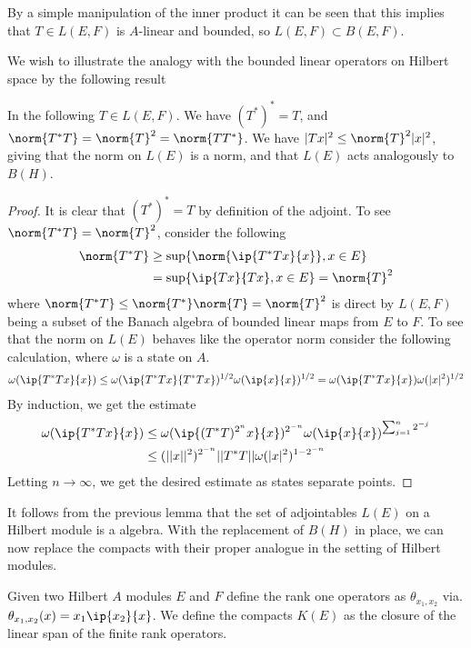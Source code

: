 \begin{remark}
	By a simple manipulation of the inner product it can be seen that this implies that $T\in L(E,F)$ is $A$-linear and bounded, so $L(E,F)\subset B(E,F)$.
\end{remark}
We wish to illustrate the analogy with the bounded linear operators on Hilbert space by the following result 
\begin{lemma}
	In the following $T\in L(E,F)$. We have $(T^*)^*=T$, and $\norm{T^*T}=\norm{T}^2=\norm{TT^*}$. We have $|Tx|^2\leq \norm{T}^2 |x|^2$, giving that the norm on $L(E)$ is a \Cstar norm, and that $L(E)$ acts analogously to $B(H)$. 
\end{lemma}
\begin{proof}
	It is clear that $(T^*)^*=T$ by definition of the adjoint. 	To see $\norm{T^*T}=\norm{T}^2$, consider the following
	\begin{align*}
		\norm{T^*T}&\geq \sup\{\norm{\ip{T^*Tx}{x}},x\in E \} \\
		&=\sup\{\ip{Tx}{Tx},x\in E\}=\norm{T}^2
	\end{align*}
	where $\norm{T^*T}\leq \norm{T^*}\norm{T}=\norm{T}^2$ is direct by $L(E,F)$ being a subset of the Banach algebra of bounded linear maps from $E$ to $F$. To see that the norm on $L(E)$ behaves like the operator norm consider the following calculation, where $\omega$ is a state on $A$. 
	\begin{align*}
		\omega(\ip{T^*Tx}{x})\leq \omega(\ip{T^*Tx}{T^*Tx})^{1/2}\omega(\ip{x}{x})^{1/2}=\omega(\ip{T^*Tx}{x})\omega(|x|^2)^{1/2}
	\end{align*}
	By induction, we get the estimate 
	\begin{align*}
		\omega(\ip{T^*Tx}{x})&\leq \omega(\ip{(T^*T)^{2^n}x}{x})^{2^{-n}}\omega(\ip{x}{x})^{\sum_{j=1}^n 2^{-j}} \\
		&\leq (||x||^2)^{2^{-n}}||T^*T||\omega(|x|^2)^{1-2^{-n}}
	\end{align*}
	Letting $n\to \infty$, we get the desired estimate as states separate points. 
\end{proof}
It follows from the previous lemma that the set of adjointables $L(E)$ on a Hilbert module is a \Cstar algebra. 
With the replacement of $B(H)$ in place, we can now replace the compacts with their proper analogue in the setting of Hilbert modules. 
\begin{definition}
	Given two Hilbert $A$ modules $E$ and $F$ define the rank one operators as $\theta_{x_1,x_2}$ via. $\theta_{x_1,x_2}(x)=x_1\ip{x_2}{x}$. We define the compacts $K(E)$ as the closure of the linear span of the finite rank operators. 
\end{definition}
